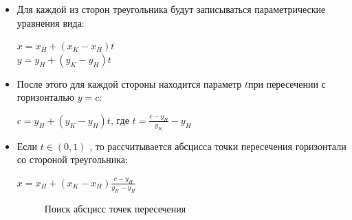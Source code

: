 \documentclass[a4paper,14pt]{extreport}
\begin{document}
\begin{itemize}
	\item Для каждой из сторон треугольника будут записываться параметрические
уравнения вида:
	\begin{center}
	\begin{math}
		x = x_H + (x_K - x_H)t
	\end{math}\\
	\begin{math}
		y = y_H + (y_K - y_H)t
	\end{math}
	\end{center}
	\item После этого для каждой стороны находится параметр \begin{math} t \end{math}при пересечении с горизонталью \begin{math} y = c\end{math}:
	\begin{center}
	\begin{math}
		c = y_H + (y_K - y_H)t
	\end{math}, где 
	\begin{math}
		t = \frac{
		c - y_H
  		}{
  		y_K
		} - y_H
	\end{math}
	\end{center}
	\item Если \begin{math} t \in (0, 1)\end{math} , то рассчитывается абсцисса точки
пересечения горизонтали со стороной треугольника:
	\begin{center} 
	\begin{math}
		x = x_H + (x_K - x_H) \frac{
		c - y_H
  		}{
  		y_K - y_H
		}
	\end{math}
	\end{center}
	\begin{figure}[H]
		\caption{Поиск абсцисс точек пересечения}
		\label{ris:image}
		\end{figure}
\end{itemize}
\end{document}
